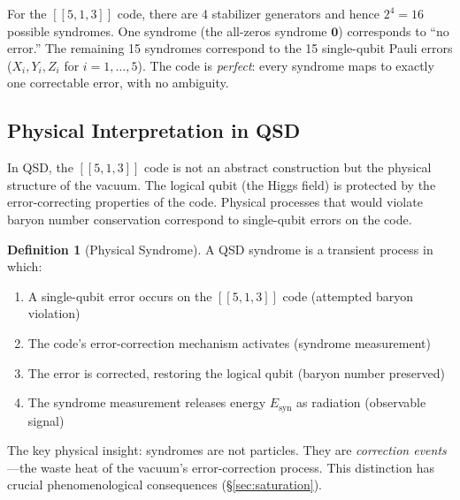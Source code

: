\documentclass[11pt,a4paper]{article}
\theoremstyle{definition}
\newtheorem{definition}[theorem]{Definition}
\theoremstyle{remark}
\newcommand{\Esyn}{E_{\mathrm{syn}}}
\begin{document}
For the $[[5,1,3]]$ code, there are 4 stabilizer generators and hence $2^4 = 16$ possible syndromes. One syndrome (the all-zeros syndrome $\mathbf{0}$) corresponds to ``no error.'' The remaining 15 syndromes correspond to the 15 single-qubit Pauli errors ($X_i, Y_i, Z_i$ for $i = 1,\ldots,5$). The code is \emph{perfect}: every syndrome maps to exactly one correctable error, with no ambiguity.

\subsection{Physical Interpretation in QSD}

In QSD, the $[[5,1,3]]$ code is not an abstract construction but the physical structure of the vacuum. The logical qubit (the Higgs field) is protected by the error-correcting properties of the code. Physical processes that would violate baryon number conservation correspond to single-qubit errors on the code.

\begin{definition}[Physical Syndrome]
A QSD syndrome is a transient process in which:
\begin{enumerate}[nosep]
\item A single-qubit error occurs on the $[[5,1,3]]$ code (attempted baryon violation)
\item The code's error-correction mechanism activates (syndrome measurement)
\item The error is corrected, restoring the logical qubit (baryon number preserved)
\item The syndrome measurement releases energy $\Esyn$ as radiation (observable signal)
\end{enumerate}
\end{definition}

The key physical insight: syndromes are not particles. They are \emph{correction events}---the waste heat of the vacuum's error-correction process. This distinction has crucial phenomenological consequences (\S\ref{sec:saturation}).
\end{document}
